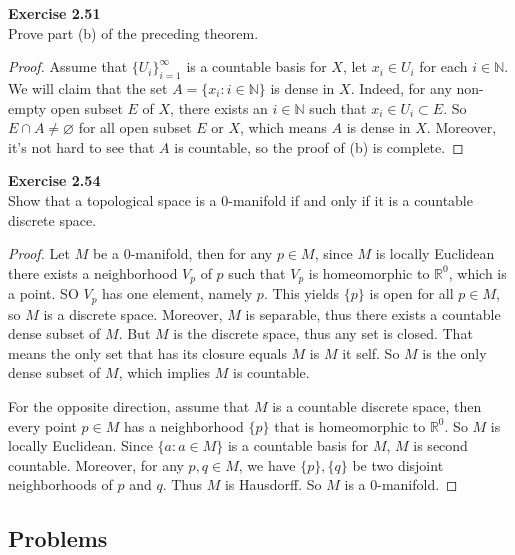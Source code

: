 \documentclass[12pt, a4paper]{article}
\theoremstyle{plain}
\newcommand{\N}{\mathbb{N}}
\newcommand{\R}{\mathbb{R}}
\newenvironment{exercise}[2][Exercise]
    { \begin{mdframed}[backgroundcolor=gray!20] \textbf{#1 #2} \\}
    {  \end{mdframed}}
\begin{document}
\begin{exercise}{2.51}
Prove part (b) of the preceding theorem.
\end{exercise}
	\begin{proof}
	Assume that $\{U_i\}_{i=1}^\infty$ is a countable basis for $X$, let $x_i\in U_i$ for each $i\in \N$. We will claim that the set $A=\{x_i:i\in\N\}$ is dense in $X$. Indeed, for any non-empty open subset $E$ of $X$, there exists an $i\in\N$ such that $x_i\in U_i\subset E$. So $E\cap A\neq \varnothing$ for all open subset $E$ or $X$, which means $A$ is dense in $X$. Moreover, it's not hard to see that $A$ is countable, so the proof of (b) is complete.
	\end{proof}

\begin{exercise}{2.54}
Show that a topological space is a $0$-manifold if and only if it is a countable discrete space.
\end{exercise}
	\begin{proof}
	Let $M$ be a $0$-manifold, then for any $p\in M$, since $M$ is locally Euclidean there exists a neighborhood $V_p$ of $p$ such that $V_p$ is homeomorphic to $\R^0$, which is a point. SO $V_p$ has one element, namely $p$. This yields $\{p\}$ is open for all $p\in M$, so $M$ is a discrete space. Moreover, $M$ is separable, thus there exists a countable dense subset of $M$. But $M$ is the discrete space, thus any set is closed. That means the only set that has its closure equals $M$ is $M$ it self. So $M$ is the only dense subset of $M$, which implies $M$ is countable.
	
	For the opposite direction, assume that $M$ is a countable discrete space, then every point $p\in M$ has a neighborhood $\{p\}$ that is homeomorphic to $\R^0$. So $M$ is locally Euclidean. Since $\{a:a\in M\}$ is a countable basis for $M$, $M$ is second countable. Moreover, for any $p,q\in M$, we have $\{p\},\{q\}$ be two disjoint neighborhoods of $p$ and $q$. Thus $M$ is Hausdorff. So $M$ is a $0$-manifold.
	\end{proof}

\pagebreak

\subsection{Problems}
\end{document}
